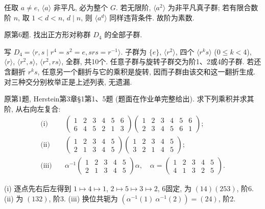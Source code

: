 \begin{solution}
任取 $a\ne e$, $\langle a\rangle$ 非平凡, 必为整个 $G$. 若无限阶, $\langle a^2\rangle$ 为非平凡真子群; 若有限合数阶 $n$, 取 $1<d<n$, $d\mid n$, 则 $\langle a^d\rangle$ 同样违背条件. 故阶为素数.
\end{solution}
\begin{exercise}原第6题. 找出正方形对称群 $D_4$ 的全部子群.\end{exercise}
\begin{solution}
写 $D_4=\langle r,s\mid r^4=s^2=e,srs=r^{-1}\rangle$. 子群为 $\{e\}$, $\langle r^2\rangle$, 四个 $\langle r^ks\rangle$ ($0\le k<4$), $\langle r\rangle$, $\langle r^2,s\rangle$, $\langle r^2,rs\rangle$, 全群, 共10个. 任意子群与旋转子群交为阶1、2或4的子群. 若还含翻折 $r^ks$, 任意另一个翻折与它的乘积是旋转, 因而子群由该交和这一翻折生成. 对三种交分别枚举正是上述列表, 无遗漏.
\end{solution}
\begin{exercise}原第1题, Herstein第3章\S1第1、5题 (题面在作业单完整给出). 求下列乘积并求其阶, 从右向左复合:
\begin{align*}
\text{(i)}\quad&\begin{pmatrix}1&2&3&4&5&6\\6&4&5&2&1&3\end{pmatrix}
\begin{pmatrix}1&2&3&4&5&6\\2&3&4&5&6&1\end{pmatrix};\\
\text{(ii)}\quad&\begin{pmatrix}1&2&3&4&5\\2&1&3&4&5\end{pmatrix}
\begin{pmatrix}1&2&3&4&5\\3&2&1&4&5\end{pmatrix};\\
\text{(iii)}\quad&\alpha^{-1}\begin{pmatrix}1&2&3&4&5\\2&1&3&4&5\end{pmatrix}\alpha,
\quad\alpha=\begin{pmatrix}1&2&3&4&5\\4&1&3&2&5\end{pmatrix}.
\end{align*}
\end{exercise}
\begin{solution}
(i) 逐点先右后左得到 $1\mapsto4\mapsto1$, $2\mapsto5\mapsto3\mapsto2$, 6固定, 为 $(14)(253)$, 阶6. (ii) 为 $(132)$, 阶3. (iii) 换位共轭为 $(\alpha^{-1}(1)\ \alpha^{-1}(2))=(24)$, 阶2.
\end{solution}

